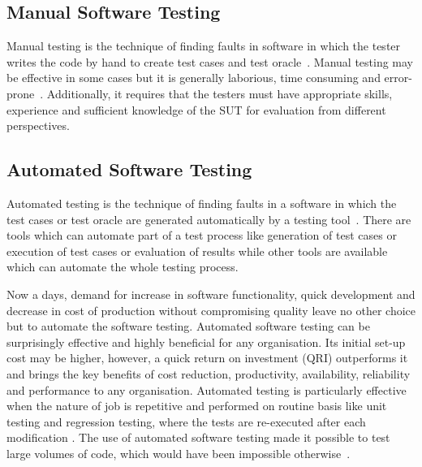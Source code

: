 


\subsection{Manual Software Testing}
Manual testing is the technique of finding faults in software in which the tester writes the code by hand to create test cases and test oracle~\cite{Ciupa2008}. Manual testing may be effective in some cases but it is generally laborious, time consuming and error-prone~\cite{tretmans1999}. Additionally, it requires that the testers must have appropriate skills, experience and sufficient knowledge of the SUT for evaluation from different perspectives.
 
\subsection{Automated Software Testing}
Automated testing is the technique of finding faults in a software in which the test cases or test oracle are generated automatically by a testing tool~\cite{Leitner2007}. There are tools which can automate part of a test process like generation of test cases or execution of test cases or evaluation of results while other tools are available which can automate the whole testing process. 

\noindent Now a days, demand for increase in software functionality, quick development and decrease in cost of production without compromising quality leave no other choice but to automate the software testing. Automated software testing can be surprisingly effective and highly beneﬁcial for any organisation. Its initial set-up cost may be higher, however, a quick return on investment (QRI) outperforms it and brings the key beneﬁts of cost reduction, productivity, availability, reliability and performance to any organisation. Automated testing is particularly effective when the nature of job is repetitive and performed on routine basis like unit testing and regression testing, where the tests are re-executed after each modification \cite{huang2003automated}. The use of automated software testing made it possible to test large volumes of code, which would have been impossible otherwise~\cite{ramamoorthy1975testing}.


